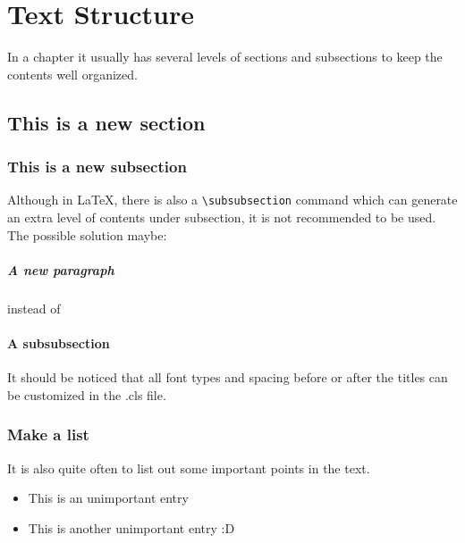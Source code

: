 \chapter{Text Structure}

In a chapter it usually has several levels of sections and subsections to keep the contents well organized. 

\section{This is a new section}

	\subsection{This is a new subsection}
	
		Although in \LaTeX, there is also a {\verb!\subsubsection!} command which can generate an extra level of contents under subsection, it is not recommended to be used. The possible solution maybe:
		
		\paragraph{A new paragraph}
		
		instead of 
		
		\subsubsection{A subsubsection}
		
		It should be noticed that all font types and spacing before or after the titles can be customized in the .cls file.
		
	\subsection{Make a list}
		
		It is also quite often to list out some important points in the text.
		
		\begin{itemize}
			\item This is an unimportant entry
			\item This is another unimportant entry :D
		\end{itemize}